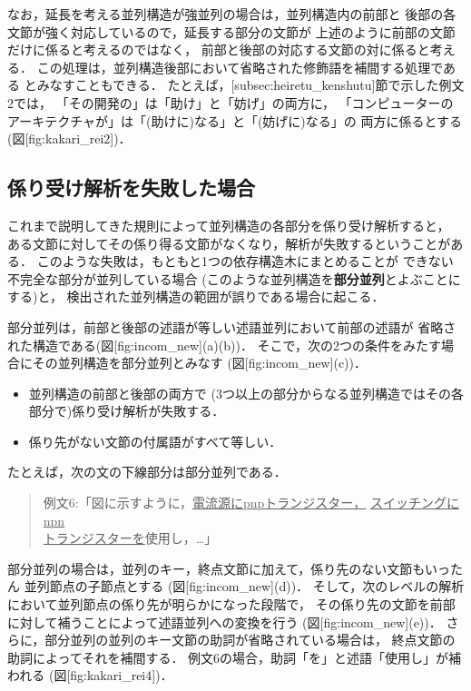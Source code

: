 {\unitlength=1mm
}

なお，延長を考える並列構造が強並列の場合は，並列構造内の前部と
後部の各文節が強く対応しているので，延長する部分の文節が
上述のように前部の文節だけに係ると考えるのではなく，
前部と後部の対応する文節の対に係ると考える．
この処理は，並列構造後部において省略された修飾語を補間する処理である
とみなすこともできる．
たとえば，[subsec:heiretu_kenshutu]節で示した例文2では，
「その開発の」は「助け」と「妨げ」の両方に，
「コンピューターのアーキテクチャが」は「(助けに)なる」と「(妨げに)なる」の
両方に係るとする(図[fig:kakari_rei2])．

{\unitlength=1mm
}

{\unitlength=1mm

}

\subsection{係り受け解析を失敗した場合}

これまで説明してきた規則によって並列構造の各部分を係り受け解析すると，
ある文節に対してその係り得る文節がなくなり，解析が失敗するということがある．
このような失敗は，もともと1つの依存構造木にまとめることが
できない不完全な部分が並列している場合
(このような並列構造を{\bf 部分並列}とよぶことにする)と，
検出された並列構造の範囲が誤りである場合に起こる．

部分並列は，前部と後部の述語が等しい述語並列において前部の述語が
省略された構造である(図[fig:incom_new](a)(b))．
そこで，次の2つの条件をみたす場合にその並列構造を部分並列とみなす
(図[fig:incom_new](c))．
\begin{itemize}
  \item 
並列構造の前部と後部の両方で
(3つ以上の部分からなる並列構造ではその各部分で)係り受け解析が失敗する．
  \item 
係り先がない文節の付属語がすべて等しい．
\end{itemize}
たとえば，次の文の下線部分は部分並列である．
\begin{quote}
例文6:「図に示すように，\underline{電流源にpnpトランジスター，} 
\underline{スイッチングにnpn} \\ \underline{トランジスターを}使用し，\ldots 」
\end{quote}
部分並列の場合は，並列のキー，終点文節に加えて，係り先のない文節もいったん
並列節点の子節点とする
(図[fig:incom_new](d))．
そして，次のレベルの解析において並列節点の係り先が明らかになった段階で，
その係り先の文節を前部に対して補うことによって述語並列への変換を行う
(図[fig:incom_new](e))．
さらに，部分並列の並列のキー文節の助詞が省略されている場合は，
終点文節の助詞によってそれを補間する．
例文6の場合，助詞「を」と述語「使用し」が補われる
(図[fig:kakari_rei4])．

